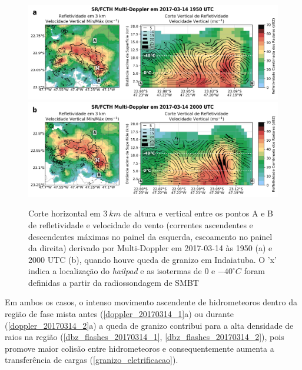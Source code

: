\begin{figure}[hbt]
	\centering
	\caption{Corte horizontal em $3\:km$ de altura e vertical entre os pontos A e B de refletividade e velocidade do vento (correntes ascendentes e descendentes máximas no painel da esquerda, escoamento no painel da direita) derivado por Multi-Doppler em 2017-03-14 às 1950 (a) e 2000 UTC (b), quando houve queda de granizo em Indaiatuba. O 'x' indica a localização do \textit{hailpad} e as isotermas de $0$ e $-40^{\circ}C$ foram definidas a partir da radiossondagem de SMBT} 
	\label{doppler_20170314_2}
	\vspace{-5pt}
	\includegraphics[width=\columnwidth]{../MultiDoppler_Processing/figures/SR-FCTH 2017-03-14 1950 UTC_ptbr.png} \\
	\vspace{-5pt}
	\includegraphics[width=\columnwidth]{../MultiDoppler_Processing/figures/SR-FCTH 2017-03-14 2000 UTC_ptbr.png} \\
\end{figure}

Em ambos os casos, o intenso movimento ascendente de hidrometeoros dentro da região de fase mista antes (\autoref{doppler_20170314_1}a) ou durante (\autoref{doppler_20170314_2}a) a queda de granizo contribui para a alta densidade de raios na região (\autoref{dbz_flashes_20170314_1}, \autoref{dbz_flashes_20170314_2}), pois promove maior colisão entre hidrometeoros e consequentemente aumenta a transferência de cargas (\autoref{granizo_eletrificacao}).

